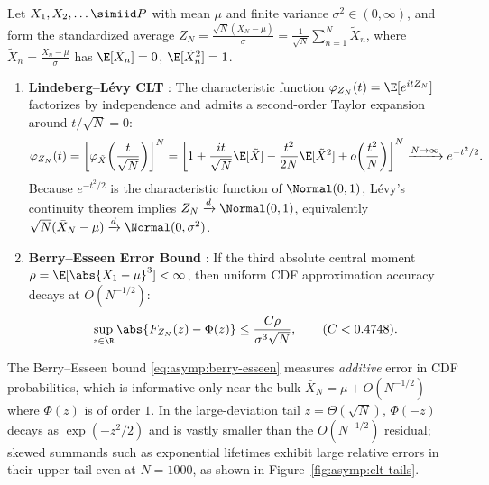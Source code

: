 \documentclass[../../../../master.tex]{subfiles}
\begin{document}
\begin{coremath}
Let $X_1, X_2, \dots \simiid P$ with mean $\mu$ and finite variance $\sigma^2 \in (0, \infty)$, and form the standardized average $Z_N = \frac{\sqrt{N}(\bar{X}_N - \mu)}{\sigma} = \frac{1}{\sqrt{N}}\sum_{n=1}^N \tilde{X}_n$, where $\tilde{X}_n = \frac{X_n - \mu}{\sigma}$ has $\E[\tilde{X}_n] = 0$, $\E[\tilde{X}_n^2] = 1$.
\begin{enumerate}
  \item \textbf{Lindeberg--L\'evy CLT} : The characteristic function $\varphi_{Z_N}(t) = \E[e^{it Z_N}]$ factorizes by independence and admits a second-order Taylor expansion around $t/\sqrt{N} = 0$:
  \begin{equation}
  \varphi_{Z_N}(t) = \left[\varphi_{\tilde{X}}\!\left(\frac{t}{\sqrt{N}}\right)\right]^N = \left[1 + \frac{it}{\sqrt{N}}\E[\tilde{X}] - \frac{t^2}{2N}\E[\tilde{X}^2] + o\!\left(\frac{t^2}{N}\right)\right]^N \xrightarrow{N \to \infty} e^{-t^2/2}.
  \end{equation}
  Because $e^{-t^2/2}$ is the characteristic function of $\Normal(0,1)$, L\'evy's continuity theorem implies $Z_N \xrightarrow{d} \Normal(0, 1)$, equivalently $\sqrt{N}(\bar{X}_N - \mu) \xrightarrow{d} \Normal(0, \sigma^2)$.
  \item \textbf{Berry--Esseen Error Bound} : If the third absolute central moment $\rho = \E[\abs{X_1 - \mu}^3] < \infty$, then uniform CDF approximation accuracy decays at $O(N^{-1/2})$:
  \begin{equation}
  \label{eq:asymp:berry-esseen}
  \sup_{z \in \R} \abs{F_{Z_N}(z) - \Phi(z)} \le \frac{C \rho}{\sigma^3 \sqrt{N}}, \qquad (C < 0.4748).
  \end{equation}
\end{enumerate}
\end{coremath}

\begin{intuition}
The Berry--Esseen bound \eqref{eq:asymp:berry-esseen} measures \emph{additive} error in CDF probabilities, which is informative only near the bulk $\bar{X}_N = \mu + O(N^{-1/2})$ where $\Phi(z)$ is of order $1$. In the large-deviation tail $z = \Theta(\sqrt{N})$, $\Phi(-z)$ decays as $\exp(-z^2/2)$ and is vastly smaller than the $O(N^{-1/2})$ residual; skewed summands such as exponential lifetimes exhibit large relative errors in their upper tail even at $N = 1000$, as shown in Figure~\ref{fig:asymp:clt-tails}.
\end{intuition}
\end{document}
